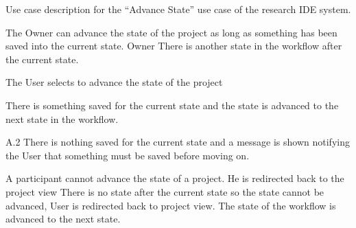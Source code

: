 \begin{table}
  \centering
  \caption{Use case description for the ``Advance State'' use case of the research IDE system.}
  \label{tbl:use-case-advance-state}

  \begin{usecase}
    The Owner can advance the state of the project as long as something has been saved into the current state.
    Owner
    There is another state in the workflow after the current state.
    \ucnormal
    \begin{ucenum}
      \item The User selects to advance the state of the project
      \item There is something saved for the current state and the state is advanced to the next state in the workflow.
    \end{ucenum}
    \begin{ucenum}
      \item [A.2] There is nothing saved for the current state and a message is shown notifying the User that something must be saved before moving on.
    \end{ucenum}
    A participant cannot advance the state of a project. He is redirected back to the project view
    There is no state after the current state so the state cannot be advanced, User is redirected back to project view.
    The state of the workflow is advanced to the next state.
  \end{usecase}
\end{table}


